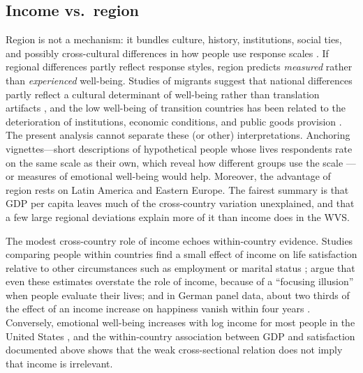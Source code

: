 \documentclass[12pt]{article}
\begin{document}
\subsection{Income vs.\ region}
Region is not a mechanism: it bundles culture, history, institutions, social ties, and possibly cross-cultural differences in how people use response scales \citep{chen_response_1995,diener_personality_2003,exton_comparing_2015}. If regional differences partly reflect response styles, region predicts \textit{measured} rather than \textit{experienced} well-being. Studies of migrants suggest that national differences partly reflect a cultural determinant of well-being rather than translation artifacts \citep{senik_french_2014,exton_comparing_2015}, and the low well-being of transition countries has been related to the deterioration of institutions, economic conditions, and public goods provision %
\citep{guriev_unhappiness_2009}. The present analysis cannot separate these (or other) interpretations. Anchoring vignettes---short descriptions of hypothetical people whose lives respondents rate on the same scale as their own, which reveal how different groups use the scale \citep{kapteyn_life_2010}---or measures of emotional well-being would help.
Moreover, the advantage of region rests on Latin America and Eastern Europe. The fairest summary is that GDP per capita leaves much of the cross-country variation unexplained, and that a few large regional deviations explain more of it than income does in the WVS.

The modest cross-country role of income echoes within-country evidence. Studies comparing people within countries find a small effect of income on life satisfaction relative to other circumstances such as employment or marital status \citep{helliwell_hows_2003,blanchflower_well-being_2004}; \citet{kahneman_would_2006} argue that even these estimates overstate the role of income, because of a ``focusing illusion'' when people evaluate their lives; and in German panel data, about two thirds of the effect of an income increase on happiness vanish within four years \citep{di_tella_happiness_2010}. Conversely, emotional well-being increases with log income for most people in the United States \citep{killingsworth_income_2023}, and the within-country association between GDP and satisfaction documented above shows that the weak cross-sectional relation does not imply that income is irrelevant.
\end{document}

